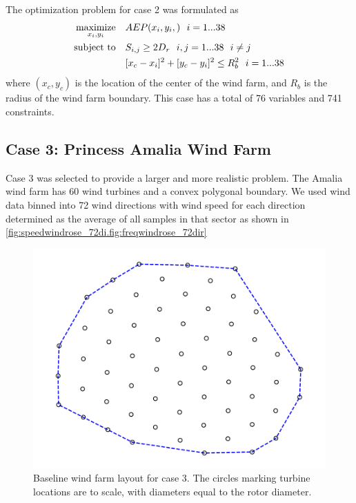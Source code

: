 \documentclass[a4paper]{jpconf}
\begin{document}
The optimization problem for case 2 was formulated as
%
\begin{equation}
	\label{e:objective}
	\begin{aligned} [b]
	\underset{x_i,y_i}{\textrm{maximize}} \quad & AEP(x_i,y_i,)~~i=1...38\\
	\textrm{subject to} \quad & S_{i,j} \geq 2\*D_{r}~~i,j=1...38~~i \neq j\\
	 & [x_c-x_i]^2+[y_c-y_i]^2 \leq R_{b}^2~~i=1...38
	\end{aligned}
\end{equation}
%
where $(x_c,y_c)$ is the location of the center of the wind farm, and $R_b$ is the radius of the wind farm boundary. This case has a total of 76 variables and 741 constraints.

\subsection{Case 3: Princess Amalia Wind Farm}
Case 3 was selected to provide a larger and more realistic problem. The Amalia wind farm has 60 wind turbines and a convex polygonal boundary. We used wind data binned into 72 wind directions with wind speed for each direction determined as the average of all samples in that sector as shown in \cref{fig:speedwindrose_72di.fig:freqwindrose_72dir}
\begin{figure}[h!]
	\centering
	\begin{minipage}[t]{18pc}
		\centering
		\includegraphics[width=1.\textwidth, trim={1.0cm, 0cm, 1.0cm, 0cm}, clip]{final_images/layouts/60_turb_start.pdf}
		\caption{Baseline wind farm layout for case 3. The circles marking turbine locations are to scale, with diameters equal to the rotor diameter.}
		\label{fig:amalia_base_layout}
	\end{minipage}\hspace{1pc}%
\end{figure}
\end{document}
